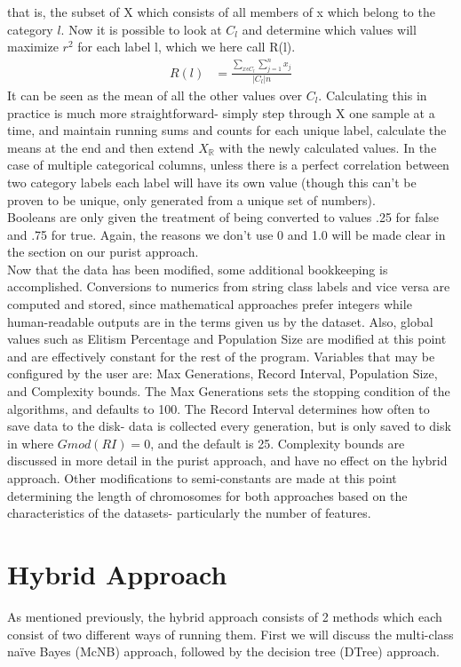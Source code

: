 that is, the subset of X which consists of all members of x which belong to the
category $l$. Now it is possible to look at $C_l$ and determine which values
will maximize $r^2$ for each label l, which we here call R(l).
\begin{align}
R(l) &= \frac{\sum_{x\epsilon C_l}\sum_{j=1}^{n}x_j}{|C_l|n}
\end{align} 
It can be seen as the mean of all the other values over $C_l$.  Calculating this
in practice is much more straightforward- simply step through X one sample at a
time, and maintain running sums and counts for each unique label, calculate the
means at the end and then extend $X_\mathbb{R}$ with the newly calculated
values.  In the case of multiple categorical columns, unless there is a perfect
correlation between two category labels each label will have its own value
(though this can't be proven to be unique, only generated from a unique set of
numbers).\\
Booleans are only given the treatment of being converted to values .25 for false
and .75 for true.  Again, the reasons we don't use 0 and 1.0 will be made clear
in the section on our purist approach.\\
Now that the data has been modified, some additional bookkeeping is
accomplished.  Conversions to numerics from string class labels and vice versa
are computed and stored, since mathematical approaches prefer integers while
human-readable outputs are in the terms given us by the dataset.  Also, global
values such as Elitism Percentage and Population Size are modified at this point
and are effectively constant for the rest of the program.  Variables that may be
configured by the user are: Max Generations, Record Interval, Population Size,
and Complexity bounds.  The Max Generations sets the stopping condition of the
algorithms, and defaults to 100.  The Record Interval determines how often to
save data to the disk- data is collected every generation, but is only saved to
disk in where $G mod(RI) = 0$, and the default is 25.  Complexity bounds are
discussed in more detail in the purist approach, and have no effect on the
hybrid approach.  Other modifications to semi-constants are made at this point
determining the length of chromosomes for both approaches based on the
characteristics of the datasets- particularly the number of features.
\section{Hybrid Approach}
As mentioned previously, the hybrid approach consists of 2 methods which each
consist of two different ways of running them.  First we will discuss the
multi-class na\"ive Bayes (McNB) approach, followed by the decision tree (DTree)
approach.
